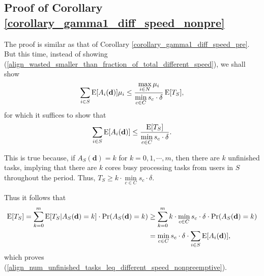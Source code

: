 \documentclass[prodmode,acmtompecs]{acmsmall}
\newcommand{\fullUserSet}{N}
\newcommand{\myComments}[1]{}
\newif\iftompecsextended
\newcommand{\tompecsextendedStart}{\iftompecsextended  \myComments{TOMPECS extended version: }}
\newcommand{\commentEnd}{\myComments{End}}
\begin{document}
\subsection{Proof of Corollary \ref{corollary_gamma1_diff_speed_nonpre}}
\label{appendix_pf_gamma1_diff_speed_nonpre}
The proof is similar as that of Corollary \ref{corollary_gamma1_diff_speed_pre}. But this time, instead of showing (\ref{align_wasted_smaller_than_fraction_of_total_different_speed}), we shall show
\begin{align}
\label{align_wasted_smaller_than_fraction_of_total_different_speed_nonpreemptive}
\sum\limits_{i\in S}\expectation[A_i(\mathbf{d})] \mu_i \leq \frac{\max\limits_{i \in \fullUserSet} \mu_i}{\min\limits_{c\in C} s_c \cdot \delta} \expectation[T_S], 
\end{align}
for which it suffices to show that
\begin{align}
\label{align_num_unfinished_tasks_leq_different_speed_nonpreemptive}
\sum\limits_{i\in S} \operatorname*{\mathrm{E}}[A_i(\mathbf{d})] \leq \frac{\operatorname*{\mathrm{E}}[T_S]}{\min\limits_{c \in C} s_c \cdot \delta}. 
\end{align}

This is true because, if $A_S(\mathbf{d}) = k$ for $k = 0, 1, \cdots, m$, then there are $k$ unfinished tasks, implying that there are $k$ cores busy processing tasks from users in $S$ throughout the period. 
Thus, $T_S \geq k \cdot \min\limits_{c \in C} s_c \cdot \delta$. 

Thus it follows that
\begin{align*}
\operatorname*{\mathrm{E}}[T_S] = \sum\limits_{k = 0}^{m} \operatorname*{\mathrm{E}}[T_S | A_S(\mathbf{d}) = k] \cdot \Pr(A_S(\mathbf{d}) = k) & \geq \sum\limits_{k = 0}^{m} k\cdot \min\limits_{c \in C} s_c \cdot \delta \cdot \Pr(A_S(\mathbf{d}) = k)	\\
& = \min\limits_{c \in C} s_c \cdot \delta \cdot \sum\limits_{i\in S} \operatorname*{\mathrm{E}}[A_i(\mathbf{d})], 
\end{align*}
which proves (\ref{align_num_unfinished_tasks_leq_different_speed_nonpreemptive}). 
\commentEnd\fi

\tompecsextendedStart
\end{document}
